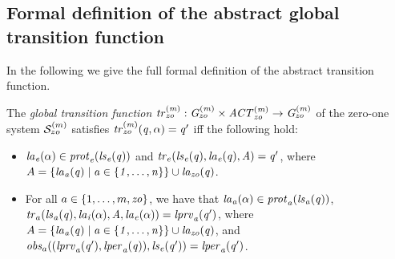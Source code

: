 \subsection*{Formal definition of the abstract global transition function} In the
following we give the full formal definition of the abstract transition function.
\begin{definition}
  \label{def:globaltransition}
  The {\em global transition function} $\it{tr}^{(m)}_{zo} : G^{(m)}_{zo}
  \times \mathit{ACT}^{(m)}_{zo} \rightarrow G^{(m)}_{zo}$ of the zero-one
  system $\mathcal{S}^{(m)}_{zo}$ satisfies $\it{tr}^{(m)}_{zo}(q, \alpha) = q'$ iff the
  following hold:
  \begin{itemize}
    \item $\it{la}_{e}({\alpha}) \in \mathit{prot}_{e}({\it{ls}_{e}(q)})$ and $\mathit{tr}_{e}(\it{ls}_{e}(q),
    \it{la}_{e}({q}), A) = q'$, where
    $A = \left \{ \it{la}_{a}({q}) \mid a \in \left \{ 1,\ldots,n \right \} \right \} \cup
\it{la}_{zo}({q})$.
    \item For all $a \in \left \{ 1,\ldots,m, \it{zo} \right \}$, we have that
    $\it{la}_{a}({\alpha}) \in \mathit{prot}_{a}(\it{ls}_{a}(q))$, $\mathit{tr}_{a} (\it{ls}_{a}(q), \it{la}_{i}({\alpha}),
    A, \it{la}_{e}({\alpha})) = \it{lprv}_{a}(q')$, where  $A = \left \{ \it{la}_{a}({q}) \mid a \in
    \left \{ 1,\ldots,n \right \} \right \} \cup \it{la}_{zo}({q})$, and $\mathit{obs}_{a}((\it{lprv}_{a}(q'),\it{lper}_{a}(q)),\it{ls}_{e}(q')) = \it{lper}_{a}(q')$.
  \end{itemize}
\end{definition}





